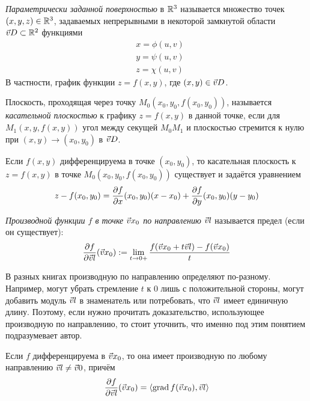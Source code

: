 \begin{multicols}{2}
\begin{definition}{}{}
	\textit{Параметрически заданной поверхностью} в $\mathbb{R}^3$ называется множество точек $(x, y, z) \in \mathbb{R}^3$, задаваемых непрерывными в некоторой замкнутой области $\vec{v}{D} \subset \mathbb{R}^2$ функциями
	\begin{align*}
		&{x = \phi(u, v)}
		\\
		&{y = \psi(u, v)}
		\\
		&{z = \chi(u, v)}
	\end{align*}
	В частности, график функции $z = f(x, y)$, где $(x, y) \in \vec{v}{D}$.
\end{definition}

\begin{definition}{}{}
	Плоскость, проходящая через точку $M_0(x_0, y_0, f(x_0, y_0))$, называется \textit{касательной плоскостью} к графику $z = f(x, y)$ в данной точке, если для $M_1(x, y, f(x, y))$ угол между секущей $M_0 M_1$ и плоскостью стремится к нулю при $(x, y) \to (x_0, y_0)$ в $\vec{v}{D}$.
\end{definition}

\begin{theorema}{}{}
	Если $f(x, y)$ дифференцируема в точке $(x_0, y_0)$, то касательная плоскость к $z = f(x, y)$ в точке $M_0(x_0, y_0, f(x_0, y_0))$ существует и задаётся уравнением
	\[
		z - f(x_0, y_0) = \frac{\partial f}{\partial x} (x_0, y_0) (x - x_0) + \frac{\partial f}{\partial y} (x_0, y_0) (y - y_0)
	\]
\end{theorema}


\begin{definition}{}{}
	\textit{Производной функции $f$ в точке $\vec{v}{x}_0$ по направлению} $\vec{v}{l}$ называется предел (если он существует):
	\[
		\frac{\partial f}{\partial \vec{v}{l}} (\vec{v}{x}_0) := \lim\limits_{t \to 0+} \frac{f(\vec{v}{x}_0 + t\vec{v}{l}) - f(\vec{v}{x}_0)}{t}
	\]
\end{definition}

\begin{note}{}{}
	В разных книгах производную по направлению определяют по-разному. Например, могут убрать стремление $t$ к 0 лишь с положительной стороны, могут добавить модуль $\vec{v}{l}$ в знаменатель или потребовать, что $\vec{v}{l}$ имеет единичную длину. Поэтому, если нужно прочитать доказательство, использующее производную по направлению, то стоит уточнить, что именно под этим понятием подразумевает автор.
\end{note}

\begin{proposition}{}{}
	Если $f$ дифференцируема в $\vec{v}{x}_0$, то она имеет производную по любому направлению $\vec{v}{l} \neq \vec{v}{0}$, причём
	\[
		\frac{\partial f}{\partial \vec{v}{l}} (\vec{v}{x}_0) = \left\langle\operatorname{grad} f(\vec{v}{x}_0), \vec{v}{l}\right\rangle
	\]
\end{proposition}


\end{multicols}
